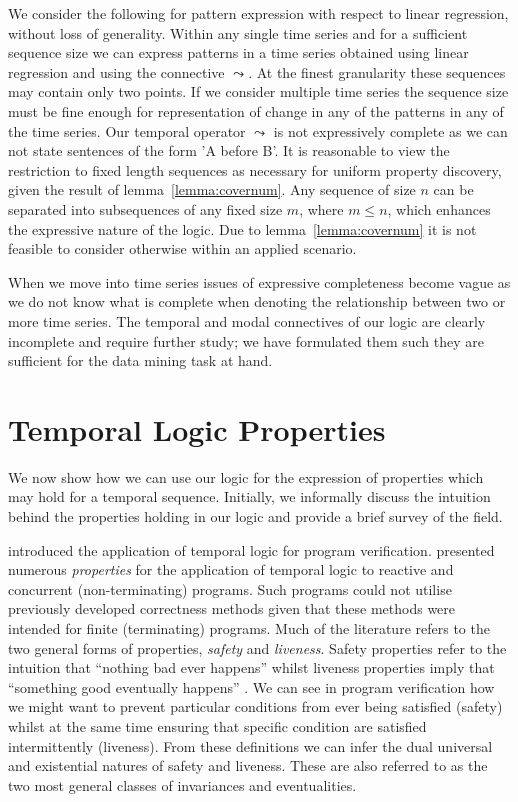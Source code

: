 \medskip
We consider the following for pattern expression with respect to
linear regression, without loss of generality. Within any single time
series and for a sufficient sequence size we can express patterns in a
time series obtained using linear regression and using the connective
$\leadsto$. At the finest
granularity these sequences may contain only two points. If we
consider multiple 
time series the sequence size must be fine enough for representation
of change in any of the patterns in any of the time series. Our
temporal operator $\leadsto$ is not expressively complete as we can
not state sentences of the form 'A before B'. It is reasonable to view
the restriction to fixed length sequences as necessary for uniform
property discovery, given the result of
lemma~\ref{lemma:covernum}. Any sequence of size $n$ can be separated
into 
subsequences of any fixed size $m$, where $m \le n$, which enhances
the expressive nature of the logic. Due to lemma~\ref{lemma:covernum}
it is not feasible to consider otherwise within an applied scenario.

\medskip

When we move into time
series issues of expressive completeness become vague as we do not
know what is complete when denoting the relationship between two or
more time series. The
temporal and modal connectives of our logic are clearly incomplete and
require further study; we have
formulated them such they are sufficient for the data mining task at hand.


\section{Temporal Logic Properties}\label{sec:tl_properties}


We now show how we can use our logic for the expression of properties
which may hold for a temporal sequence. Initially, we informally
discuss the intuition behind the properties holding in our logic and
provide a brief survey of the field.
\medskip

\cite{pnu77} introduced the application of temporal logic for program
verification. \cite{gps80} presented numerous {\em properties} for the
application of temporal logic to reactive and concurrent
(non-terminating) programs. Such programs could not utilise previously
developed correctness methods given that these methods were intended 
for finite (terminating) programs. Much of the literature refers to
the two general forms of properties, {\em safety } and {\em
liveness}. Safety properties refer to the intuition that ``nothing
bad ever happens'' whilst liveness properties imply that ``something good
eventually happens'' \cite{sis94}. We can see in program verification how we
might want to prevent particular conditions from ever being satisfied
(safety) whilst at the same time ensuring that specific condition are
satisfied intermittently (liveness). From these definitions we can
infer the dual universal and existential natures of safety and
liveness. These are also referred to as the two most general classes
of invariances and eventualities.

